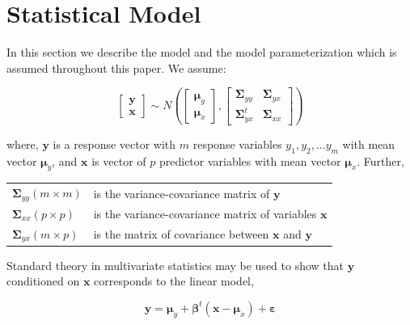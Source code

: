 \documentclass[review]{elsarticle}
\theoremstyle{definition}
\theoremstyle{definition}
\theoremstyle{remark}
\begin{document}
\section{Statistical Model}\label{statistical-model}

In this section we describe the model and the model parameterization
which is assumed throughout this paper. We assume:

\begin{equation}
  \begin{bmatrix}\mathbf{y}\\ \mathbf{x}\end{bmatrix} \sim N
  \left(
    \begin{bmatrix}
      \boldsymbol{\mu}_y \\
      \boldsymbol{\mu}_x
    \end{bmatrix},
    \begin{bmatrix}
      \boldsymbol{\Sigma}_{yy} & \boldsymbol{\Sigma}_{yx} \\
      \boldsymbol{\Sigma}_{yx}^t & \boldsymbol{\Sigma}_{xx}
    \end{bmatrix}
  \right)
  \label{eq:rand-reg-model}
\end{equation}

where, \(\mathbf{y}\) is a response vector with \(m\) response variables
\(y_1, y_2, \ldots y_m\) with mean vector \(\boldsymbol{\mu}_y\), and
\(\mathbf{x}\) is vector of \(p\) predictor variables with mean vector
\(\boldsymbol{\mu}_x\). Further,

\begin{longtable}[]{@{}ll@{}}
\toprule
\(\boldsymbol{\Sigma}_{yy} (m \times m)\) & is the variance-covariance
matrix of \(\mathbf{y}\)\tabularnewline
\(\boldsymbol{\Sigma}_{xx} (p \times p)\) & is the variance-covariance
matrix of variables \(\mathbf{x}\)\tabularnewline
\(\boldsymbol{\Sigma}_{yx} (m \times p)\) & is the matrix of covariance
between \(\mathbf{x}\) and \(\mathbf{y}\)\tabularnewline
\bottomrule
\end{longtable}

\addtocounter{table}{-1}

Standard theory in multivariate statistics may be used to show that
\(\mathbf{y}\) conditioned on \(\mathbf{x}\) corresponds to the linear
model,

\begin{equation}
\mathbf{y} = \boldsymbol{\mu}_y + \boldsymbol{\beta}^t (\mathbf{x} - \boldsymbol{\mu}_x) + \boldsymbol{\varepsilon}
  \label{eq:linear-model}
\end{equation}
\end{document}
